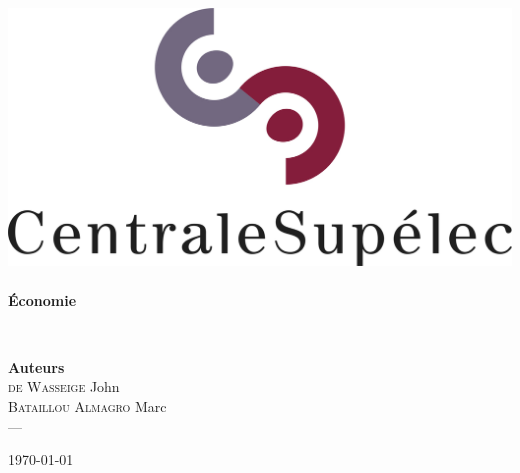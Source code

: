 \begin{titlepage}
\begin{center}


\includegraphics[scale=0.5]{./img/logo_centralesup.jpg} \\[1.5cm]



\vfill
\HRule \\[0.4cm]
{ \huge \bfseries Économie \\[0.4cm] }

\HRule \\[1.5cm]
\vfill
{\large
\begin{center}
  {\Large  \hspace{0.5cm} \textbf{Auteurs} \hspace{0.5cm}   } \\[0.3cm]
	\textsc{de Wasseige} John  \\
	\textsc{Bataillou Almagro} Marc \\
	  ---
\end{center}
}
\vfill

{\large \today}

\end{center}
\end{titlepage}